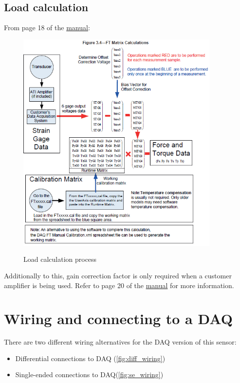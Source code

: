 \documentclass[a4paper]{article}
\begin{document}
\subsection{Load calculation}

From page 18 of the \hyperref{https://www.ati-ia.com/app_content/documents/9620-05-DAQ.pdf}{category}{name}{manual}:

\begin{figure}[h!]
	\centering
	\includegraphics[width=0.9\textwidth]{load_calc.png}
	\label{fig:load_calc}
	\caption{Load calculation process}
\end{figure}

Additionally to this, gain correction factor is only required when a customer amplifier is being used. Refer to page 20 of the \hyperref{https://www.ati-ia.com/app_content/documents/9620-05-DAQ.pdf}{category}{name}{manual} for more information.

\section{Wiring and connecting to a DAQ}


There are two different wiring alternatives for the DAQ version of this sensor:

\begin{itemize}
	\item Differential connections to DAQ (\autoref{fig:diff_wiring}) 
	\item Single-ended connections to DAQ(\autoref{fig:se_wiring}) 
\end{itemize}
\end{document}
